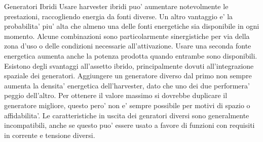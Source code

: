 \begin{section}{Generatori Ibridi}
    Usare harvester ibridi puo' aumentare notevolmente le prestazioni, raccogliendo energia da fonti diverse. Un altro vantaggio e' la probabilita' piu' alta che almeno una delle fonti energetiche sia disponibile in ogni momento. Alcune combinazioni sono particolarmente sinergistiche per via della zona d'uso o delle condizioni necessarie all'attivazione. Usare una seconda fonte energetica aumenta anche la potenza prodotta quando entrambe sono disponibili. Esistono degli svantaggi all'assetto ibrido, principalmente dovuti all'integrazione spaziale dei generatori. Aggiungere un generatore diverso dal primo non sempre aumenta la densita' energetica dell'harvester, dato che uno dei due performera' peggio dell'altro. Per ottenere il valore massimo si dovrebbe duplicare il generatore migliore, questo pero' non e' sempre possibile per motivi di spazio o affidabilita'. Le caratteristiche in uscita dei genratori diversi sono generalmente incompatibili, anche se questo puo' essere usato a favore di funzioni con requisiti in corrente e tensione diversi\cite{shaukatApplicationsSustainableHybrid2023}. 
\end{section}

